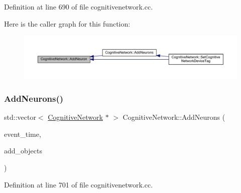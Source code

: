 Definition at line 690 of file cognitivenetwork.\+cc.

Here is the caller graph for this function\+:
\nopagebreak
\begin{figure}[H]
\begin{center}
\leavevmode
\includegraphics[width=350pt]{class_cognitive_network_a8457342637fde2d814c54942c3367416_icgraph}
\end{center}
\end{figure}
\mbox{\label{class_cognitive_network_ade928e3355db97d3c5d99501ff4a3b69}} 
\subsubsection{\texorpdfstring{Add\+Neurons()}{AddNeurons()}}
{\footnotesize\ttfamily std\+::vector$<$ \hyperlink{class_cognitive_network}{Cognitive\+Network} $\ast$ $>$ Cognitive\+Network\+::\+Add\+Neurons (\begin{DoxyParamCaption}\item[{std\+::chrono\+::time\+\_\+point$<$ \hyperlink{universe_8h_a0ef8d951d1ca5ab3cfaf7ab4c7a6fd80}{Clock} $>$}]{event\+\_\+time,  }\item[{std\+::vector$<$ \hyperlink{class_cognitive_network}{Cognitive\+Network} $\ast$$>$}]{add\+\_\+objects }\end{DoxyParamCaption})}



Definition at line 701 of file cognitivenetwork.\+cc.

